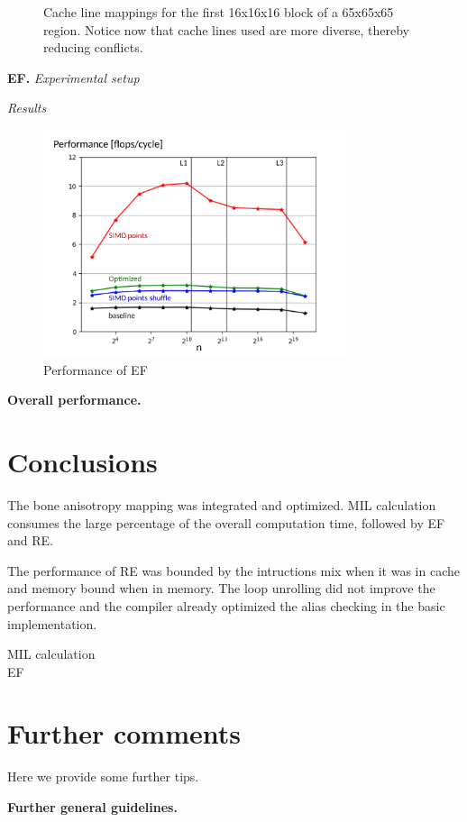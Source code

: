 \documentclass[letterpaper]{article}
\newcommand{\mypar}[1]{{\bf #1.}}
\newcommand\inputpgf[2]{{
\let\pgfimageWithoutPath\pgfimage
\renewcommand{\pgfimage}[2][]{\pgfimageWithoutPath[##1]{#1/##2}}

}}
\begin{document}
\begin{figure}[H]
  \inputpgf{figs/conflict_miss}{mil_blocking_conflicts_65.pgf}\vspace{-1cm}
  \caption{Cache line mappings for the first 16x16x16 block of a 65x65x65 region. Notice now that cache lines used are more diverse, thereby reducing conflicts. }
  \label{res:conflict_miss_65}
\end{figure}

\mypar{EF} \textit{Experimental setup}

\textit{Results}
 
\begin{figure}[H]
  \centering \includegraphics[width=3.5in]{figs/plots/ellipsoid/ellipsoid_performance.pdf}
  \caption{Performance of EF}
  \label{res:ellipsoid}
\end{figure}


\mypar{Overall performance}

\section{Conclusions}

The bone anisotropy mapping was integrated and optimized. MIL calculation consumes the large percentage of the overall computation time, followed by EF and RE. 

The performance of RE was bounded by the intructions mix when it was in cache and memory bound when in memory. The loop unrolling did not improve the performance and the compiler already optimized the alias checking in the basic implementation.

MIL calculation\\

EF\\


\section{Further comments}

Here we provide some further tips. 

\mypar{Further general guidelines}



\end{document}
